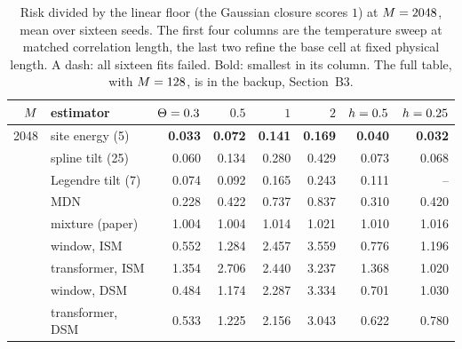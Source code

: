 \begin{table}[t]
\setlength{\tabcolsep}{6pt}
\centering
\footnotesize
\caption{Risk divided by the linear floor (the Gaussian closure scores $1$) at $M=2048$, mean over sixteen seeds. The first four columns are the temperature sweep at matched correlation length, the last two refine the base cell at fixed physical length. A dash: all sixteen fits failed. Bold: smallest in its column. The full table, with $M=128$, is in the backup, Section~B3.}
\label{tab:fieldscore2048}
\begin{tabular}{@{}rlrrrrrr@{}}
\toprule
$M$ & estimator & $\Theta=0.3$ & $0.5$ & $1$ & $2$ & $h=0.5$ & $h=0.25$ \\
\midrule
2048 & site energy (5) & \textbf{0.033} & \textbf{0.072} & \textbf{0.141} & \textbf{0.169} & \textbf{0.040} & \textbf{0.032} \\
 & spline tilt (25) & 0.060 & 0.134 & 0.280 & 0.429 & 0.073 & 0.068 \\
 & Legendre tilt (7) & 0.074 & 0.092 & 0.165 & 0.243 & 0.111 & -- \\
 & MDN & 0.228 & 0.422 & 0.737 & 0.837 & 0.310 & 0.420 \\
 & mixture (paper) & 1.004 & 1.004 & 1.014 & 1.021 & 1.010 & 1.016 \\
 & window, ISM & 0.552 & 1.284 & 2.457 & 3.559 & 0.776 & 1.196 \\
 & transformer, ISM & 1.354 & 2.706 & 2.440 & 3.237 & 1.368 & 1.020 \\
 & window, DSM & 0.484 & 1.174 & 2.287 & 3.334 & 0.701 & 1.030 \\
 & transformer, DSM & 0.533 & 1.225 & 2.156 & 3.043 & 0.622 & 0.780 \\
\bottomrule
\end{tabular}
\end{table}

